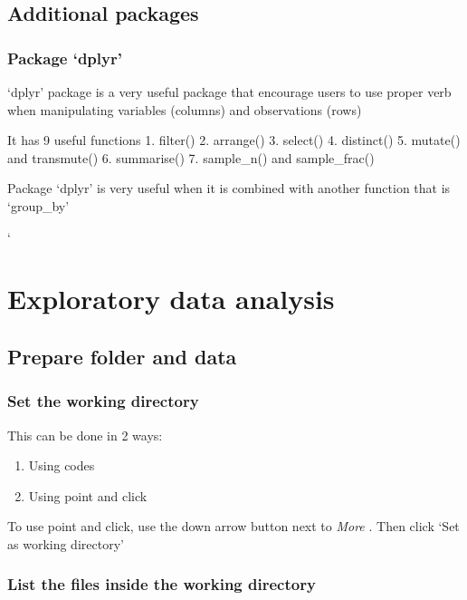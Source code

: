 \documentclass[]{book}
\providecommand{\tightlist}{%
  \setlength{\itemsep}{0pt}\setlength{\parskip}{0pt}}
\theoremstyle{definition}
\theoremstyle{definition}
\theoremstyle{remark}
\begin{document}
\section{Additional packages}\label{additional-packages}

\subsection{\texorpdfstring{Package
`dplyr'}{Package dplyr}}\label{package-dplyr}

`dplyr' package is a very useful package that encourage users to use
proper verb when manipulating variables (columns) and observations
(rows)

It has 9 useful functions 1. filter() 2. arrange() 3. select() 4.
distinct() 5. mutate() and transmute() 6. summarise() 7. sample\_n() and
sample\_frac()

Package `dplyr' is very useful when it is combined with another function
that is `group\_by'

`

\chapter{Exploratory data analysis}\label{exploratory-data-analysis}

\section{Prepare folder and data}\label{prepare-folder-and-data-1}

\subsection{Set the working
directory}\label{set-the-working-directory-1}

This can be done in 2 ways:

\begin{enumerate}
\def\labelenumi{\arabic{enumi}.}
\tightlist
\item
  Using codes
\item
  Using point and click
\end{enumerate}

To use point and click, use the down arrow button next to \emph{More} .
Then click `Set as working directory'

\subsection{List the files inside the working
directory}\label{list-the-files-inside-the-working-directory}
\end{document}

